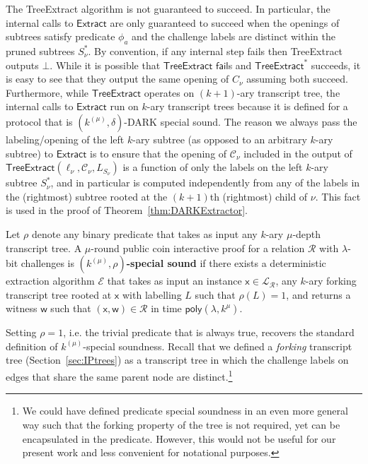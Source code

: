 The \textsf{TreeExtract} algorithm is not guaranteed to succeed. In particular, the internal calls to $\textsf{Extract}$ are only guaranteed to succeed when the openings of subtrees satisfy predicate $\phi_a$ and the challenge labels are distinct within the pruned subtrees $S^*_\nu$. By convention, if any internal step fails then \textsf{TreeExtract} outputs $\bot$. While it is possible that $\textsf{TreeExtract}$ $\mathsf{fail}$s and $\textsf{TreeExtract}^*$ succeeds, it is easy to see that they output the same opening of $C_\nu$ assuming both succeed. Furthermore, while $\textsf{TreeExtract}$ operates on $(k+1)$-ary transcript tree, the internal calls to $\textsf{Extract}$ run on $k$-ary transcript trees because it is defined for a protocol that is $(k^{(\mu)}, \delta)$-DARK special sound. The reason we always pass the labeling/opening of the left $k$-ary subtree (as opposed to an arbitrary $k$-ary subtree) to $\textsf{Extract}$ is to ensure that the opening of $\mathcal{C}_\nu$ included in the output of $\textsf{TreeExtract}(\ell_\nu, \mathcal{C}_\nu, L_{S_\nu})$ is a function of only the labels on the left $k$-ary subtree $S^*_\nu$, and in particular is computed independently from any of the labels in the (rightmost) subtree rooted at the $(k+1)$th (rightmost) child of $\nu$. This fact is used in the proof of Theorem~\ref{thm:DARKExtractor}.

\begin{definition}
	Let $\rho$ denote any binary predicate that takes as input any $k$-ary $\mu$-depth transcript tree. A $\mu$-round public coin interactive proof for a relation $\mathcal{R}$ with $\lambda$-bit challenges is \textbf{$(k^{(\mu)}, \rho)$-special sound} if there exists a deterministic extraction algorithm $\mathcal{E}$ that takes as input an instance $\mathsf{x} \in \mathcal{L}_\mathcal{R}$, any $k$-ary forking transcript tree rooted at $\mathsf{x}$ with labelling $L$ such that $\rho(L) = 1$, and returns a witness $\mathsf{w}$ such that $(\mathsf{x}, \mathsf{w}) \in \mathcal{R}$ in time $\textsf{poly}(\lambda, k^\mu)$. 
\end{definition}
Setting $\rho = 1$, i.e. the trivial predicate that is always true, recovers the standard definition of $k^{(\mu)}$-special soundness. Recall that we defined a \emph{forking} transcript tree (Section~\ref{sec:IPtrees}) as a transcript tree in which the challenge labels on edges that share the same parent node are distinct.\footnote{We could have defined predicate special soundness in an even more general way such that the forking property of the tree is not required, yet can be encapsulated in the predicate. However, this would not be useful for our present work and less convenient for notational purposes.} 

